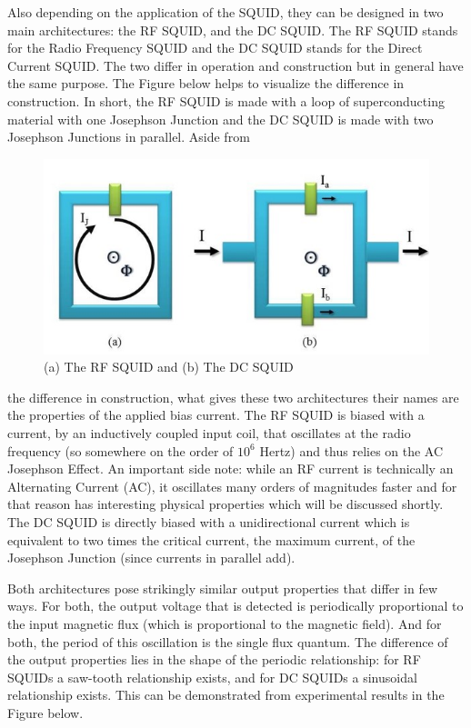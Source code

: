 \documentclass[conf]{new-aiaa}
\begin{document}
Also depending on the application of the SQUID, they can be designed in two main architectures: the RF SQUID, and the DC SQUID. The RF SQUID stands for the Radio Frequency SQUID and the DC SQUID stands for the Direct Current SQUID. The two differ in operation and construction but in general have the same purpose. The Figure below helps to visualize the difference in construction. In short, the RF SQUID is made with a loop of superconducting material with one Josephson Junction and the DC SQUID is made with two Josephson Junctions in parallel. Aside from

\begin{figure}[!h]
    \centering
    \includegraphics[scale = 0.7]{RFDC.jpg}
    \caption{(a) The RF SQUID and (b) The DC SQUID}
\end{figure}

\noindent
the difference in construction, what gives these two architectures their names are the properties of the applied bias current. The RF SQUID is biased with a current, by an inductively coupled input coil, that oscillates at the radio frequency (so somewhere on the order of \(10^6\) Hertz) and thus relies on the AC Josephson Effect. An important side note: while an RF current is technically an Alternating Current (AC), it oscillates many orders of magnitudes faster and for that reason has interesting physical properties which will be discussed shortly. The DC SQUID is directly biased with a unidirectional current which is equivalent to two times the critical current, the maximum current, of the Josephson Junction (since currents in parallel add). 

Both architectures pose strikingly similar output properties that differ in few ways. For both, the output voltage that is detected is periodically proportional to the input magnetic flux (which is proportional to the magnetic field). And for both, the period of this oscillation is the single flux quantum. The difference of the output properties lies in the shape of the periodic relationship: for RF SQUIDs a saw-tooth relationship exists, and for DC SQUIDs a sinusoidal relationship exists. This can be demonstrated from experimental results in the Figure below. 
\end{document}
